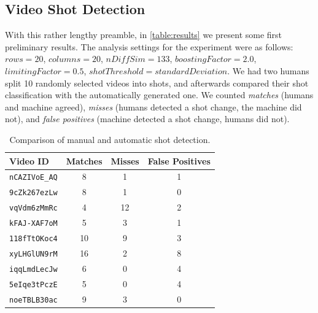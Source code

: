\documentclass{acm_proc_article-sp}
\begin{document}
\subsection{Video Shot Detection}
With this rather lengthy preamble, in \autoref{table:results} we present some first preliminary results. The analysis settings for the experiment were as follows: $\mathit{rows} = 20$, $\mathit{columns} = 20$, $\mathit{nDiffSim} = 133$, $\mathit{boostingFactor} = 2.0$, $\mathit{limitingFactor} = 0.5$, $\mathit{shotThreshold} = \mathit{standardDeviation}$. We had two humans split 10 randomly selected videos into shots, and afterwards compared their shot classification with the automatically generated one. We counted \emph{matches} (humans and machine agreed), \emph{misses} (humans detected a shot change, the machine did not), and \emph{false positives} (machine detected a shot change, humans did not). 

\begin{table}
\begin{center}  
    \begin{tabular}{ | l | c | c | c |}
    \hline
    \textbf{Video ID} & \textbf{Matches} & \textbf{Misses} & \textbf{False Positives} \\ \hline
    \texttt{nCAZIVoE\_AQ} &  8 &  1 & 1 \\ \hline
    \texttt{9cZk267ezLw}  &  8 &  1 & 0 \\ \hline
    \texttt{vqVdm6zMmRc}  &  4 & 12 & 2 \\ \hline
    \texttt{kFAJ-XAF7oM}  &  5 &  3 & 1 \\ \hline
    \texttt{118fTtOKoc4}  & 10 &  9 & 3 \\ \hline
    \texttt{xyLHGlUN9rM}  & 16 &  2 & 8 \\ \hline
    \texttt{iqqLmdLecJw}  &  6 &  0 & 4 \\ \hline
    \texttt{5eIqe3tPczE}  &  5 &  0 & 4 \\ \hline
    \texttt{noeTBLB30ac}  &  9 &  3 & 0 \\ \hline
    \end{tabular}
\end{center}
\caption{Comparison of manual and automatic shot detection.}
\label{table:results}
\end{table}
\end{document}
